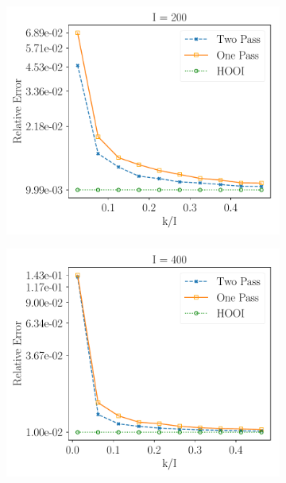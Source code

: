 \setcounter{figure}{2}    
\begin{figure}[H]
\centering
    \begin{subfigure}{0.32\textwidth}
    \includegraphics[scale = 0.3]{figure/lk_lnoise_n200.pdf}
    \end{subfigure}
    \begin{subfigure}{0.32\textwidth}
    \includegraphics[scale = 0.3]{figure/lk_lnoise_n400.pdf}
    \end{subfigure}
    \begin{subfigure}{0.32\textwidth}

\end{subfigure}
\end{figure}
